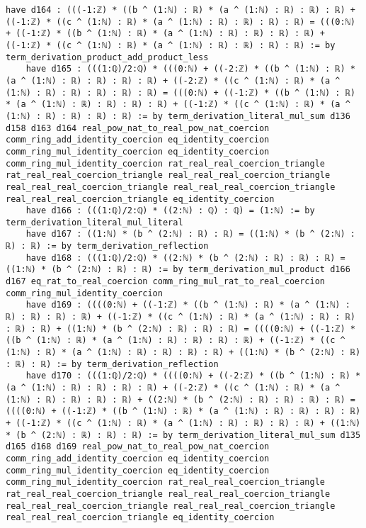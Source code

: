 \documentclass{article}
\begin{document}
\begin{tcolorbox}[colback=white!10, width=\linewidth]
\begin{lstlisting}[language=Lean4]
    have d164 : (((-1:ℤ) * ((b ^ (1:ℕ) : ℝ) * (a ^ (1:ℕ) : ℝ) : ℝ) : ℝ) + ((-1:ℤ) * ((c ^ (1:ℕ) : ℝ) * (a ^ (1:ℕ) : ℝ) : ℝ) : ℝ) : ℝ) = (((0:ℕ) + ((-1:ℤ) * ((b ^ (1:ℕ) : ℝ) * (a ^ (1:ℕ) : ℝ) : ℝ) : ℝ) : ℝ) + ((-1:ℤ) * ((c ^ (1:ℕ) : ℝ) * (a ^ (1:ℕ) : ℝ) : ℝ) : ℝ) : ℝ) := by term_derivation_product_add_product_less
    have d165 : (((1:ℚ)/2:ℚ) * (((0:ℕ) + ((-2:ℤ) * ((b ^ (1:ℕ) : ℝ) * (a ^ (1:ℕ) : ℝ) : ℝ) : ℝ) : ℝ) + ((-2:ℤ) * ((c ^ (1:ℕ) : ℝ) * (a ^ (1:ℕ) : ℝ) : ℝ) : ℝ) : ℝ) : ℝ) = (((0:ℕ) + ((-1:ℤ) * ((b ^ (1:ℕ) : ℝ) * (a ^ (1:ℕ) : ℝ) : ℝ) : ℝ) : ℝ) + ((-1:ℤ) * ((c ^ (1:ℕ) : ℝ) * (a ^ (1:ℕ) : ℝ) : ℝ) : ℝ) : ℝ) := by term_derivation_literal_mul_sum d136 d158 d163 d164 real_pow_nat_to_real_pow_nat_coercion comm_ring_add_identity_coercion eq_identity_coercion comm_ring_mul_identity_coercion eq_identity_coercion comm_ring_mul_identity_coercion rat_real_real_coercion_triangle rat_real_real_coercion_triangle real_real_real_coercion_triangle real_real_real_coercion_triangle real_real_real_coercion_triangle real_real_real_coercion_triangle eq_identity_coercion
    have d166 : (((1:ℚ)/2:ℚ) * ((2:ℕ) : ℚ) : ℚ) = (1:ℕ) := by term_derivation_literal_mul_literal
    have d167 : ((1:ℕ) * (b ^ (2:ℕ) : ℝ) : ℝ) = ((1:ℕ) * (b ^ (2:ℕ) : ℝ) : ℝ) := by term_derivation_reflection
    have d168 : (((1:ℚ)/2:ℚ) * ((2:ℕ) * (b ^ (2:ℕ) : ℝ) : ℝ) : ℝ) = ((1:ℕ) * (b ^ (2:ℕ) : ℝ) : ℝ) := by term_derivation_mul_product d166 d167 eq_rat_to_real_coercion comm_ring_mul_rat_to_real_coercion comm_ring_mul_identity_coercion
    have d169 : ((((0:ℕ) + ((-1:ℤ) * ((b ^ (1:ℕ) : ℝ) * (a ^ (1:ℕ) : ℝ) : ℝ) : ℝ) : ℝ) + ((-1:ℤ) * ((c ^ (1:ℕ) : ℝ) * (a ^ (1:ℕ) : ℝ) : ℝ) : ℝ) : ℝ) + ((1:ℕ) * (b ^ (2:ℕ) : ℝ) : ℝ) : ℝ) = ((((0:ℕ) + ((-1:ℤ) * ((b ^ (1:ℕ) : ℝ) * (a ^ (1:ℕ) : ℝ) : ℝ) : ℝ) : ℝ) + ((-1:ℤ) * ((c ^ (1:ℕ) : ℝ) * (a ^ (1:ℕ) : ℝ) : ℝ) : ℝ) : ℝ) + ((1:ℕ) * (b ^ (2:ℕ) : ℝ) : ℝ) : ℝ) := by term_derivation_reflection
    have d170 : (((1:ℚ)/2:ℚ) * ((((0:ℕ) + ((-2:ℤ) * ((b ^ (1:ℕ) : ℝ) * (a ^ (1:ℕ) : ℝ) : ℝ) : ℝ) : ℝ) + ((-2:ℤ) * ((c ^ (1:ℕ) : ℝ) * (a ^ (1:ℕ) : ℝ) : ℝ) : ℝ) : ℝ) + ((2:ℕ) * (b ^ (2:ℕ) : ℝ) : ℝ) : ℝ) : ℝ) = ((((0:ℕ) + ((-1:ℤ) * ((b ^ (1:ℕ) : ℝ) * (a ^ (1:ℕ) : ℝ) : ℝ) : ℝ) : ℝ) + ((-1:ℤ) * ((c ^ (1:ℕ) : ℝ) * (a ^ (1:ℕ) : ℝ) : ℝ) : ℝ) : ℝ) + ((1:ℕ) * (b ^ (2:ℕ) : ℝ) : ℝ) : ℝ) := by term_derivation_literal_mul_sum d135 d165 d168 d169 real_pow_nat_to_real_pow_nat_coercion comm_ring_add_identity_coercion eq_identity_coercion comm_ring_mul_identity_coercion eq_identity_coercion comm_ring_mul_identity_coercion rat_real_real_coercion_triangle rat_real_real_coercion_triangle real_real_real_coercion_triangle real_real_real_coercion_triangle real_real_real_coercion_triangle real_real_real_coercion_triangle eq_identity_coercion

\end{lstlisting}
\end{tcolorbox}
\end{document}
